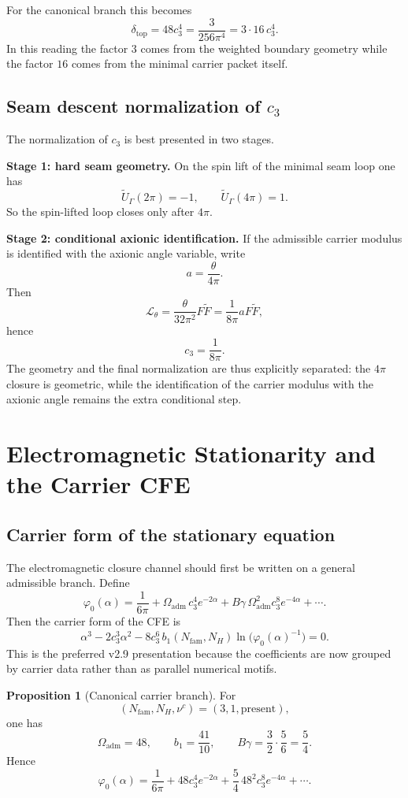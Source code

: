 \documentclass[11pt,a4paper]{article}
\theoremstyle{definition}
\newtheorem{proposition}[theorem]{Proposition}
\theoremstyle{remark}
\newcommand{\cthree}{c_3}
\newcommand{\phiz}{\varphi_0}
\newcommand{\deltatop}{\delta_{\mathrm{top}}}
\newcommand{\bone}{b_1}
\newcommand{\Oadm}{\Omega_{\mathrm{adm}}}
\begin{document}
For the canonical branch this becomes
\[
\deltatop = 48\cthree^4 = \frac{3}{256\pi^4} = 3\cdot 16\,\cthree^4.
\]
In this reading the factor $3$ comes from the weighted boundary geometry while the factor $16$ comes from the minimal carrier packet itself.

\subsection{Seam descent normalization of \texorpdfstring{$\cthree$}{c3}}

The normalization of $\cthree$ is best presented in two stages.

\textbf{Stage 1: hard seam geometry.}
On the spin lift of the minimal seam loop one has
\[
\widetilde U_\Gamma(2\pi)=-1,
\qquad
\widetilde U_\Gamma(4\pi)=1.
\]
So the spin-lifted loop closes only after $4\pi$.

\textbf{Stage 2: conditional axionic identification.}
If the admissible carrier modulus is identified with the axionic angle variable, write
\[
a=\frac{\theta}{4\pi}.
\]
Then
\[
\mathcal L_\theta = \frac{\theta}{32\pi^2}F\widetilde F
= \frac{1}{8\pi}aF\widetilde F,
\]
hence
\[
\cthree = \frac{1}{8\pi}.
\]
The geometry and the final normalization are thus explicitly separated: the $4\pi$ closure is geometric, while the identification of the carrier modulus with the axionic angle remains the extra conditional step.

\section{Electromagnetic Stationarity and the Carrier CFE}

\subsection{Carrier form of the stationary equation}

The electromagnetic closure channel should first be written on a general admissible branch. Define
\[
\phiz(\alpha)
= \frac{1}{6\pi}
+ \Oadm\,\cthree^4 e^{-2\alpha}
+ B\gamma\,\Oadm^2\cthree^8 e^{-4\alpha}
+ \cdots.
\]
Then the carrier form of the CFE is
\[
\alpha^3
-2\cthree^3\alpha^2
-8\cthree^6\,\bone(N_{\mathrm{fam}},N_H)
\ln\!\bigl(\phiz(\alpha)^{-1}\bigr)
=0.
\]
This is the preferred v2.9 presentation because the coefficients are now grouped by carrier data rather than as parallel numerical motifs.

\begin{proposition}[Canonical carrier branch]
For
\[
(N_{\mathrm{fam}},N_H,\nu^c)=(3,1,\text{present}),
\]
one has
\[
\Oadm=48,
\qquad
\bone=\frac{41}{10},
\qquad
B\gamma=\frac32\cdot\frac56=\frac54.
\]
Hence
\[
\phiz(\alpha)
= \frac{1}{6\pi}
+ 48\cthree^4 e^{-2\alpha}
+ \frac54\,48^2\cthree^8 e^{-4\alpha}
+ \cdots.
\]
\end{proposition}
\end{document}
